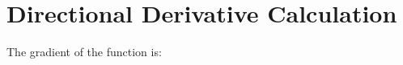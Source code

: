 \documentclass{article}
\begin{document}
    \section*{Directional Derivative Calculation}

    The gradient of the function is:
    
    
\end{document}
